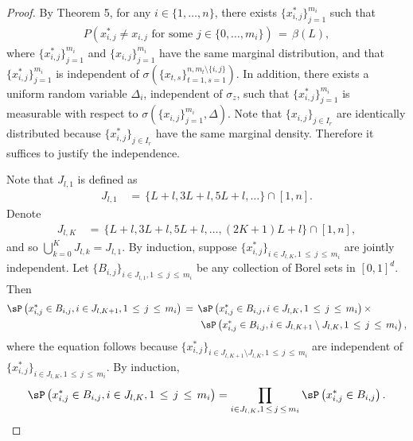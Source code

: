 \documentclass[twoside,11pt]{article}
\begin{document}
\begin{proof} By Theorem 5, for any $i \in \{1, \ldots, n\}$, there exists $\{x_{i,j}^*\}_{j=1}^{m_i}$ such that
\begin{align}
    P(x_{i,j}^* \neq x_{i,j} \text{ for some } j \in \{0, \ldots, m_i\}) \,=\, \beta(L), \label{eq:264}
\end{align}
where $\{x_{i,j}^*\}_{j=1}^{m_i}$ and $\{x_{i,j}\}_{j=1}^{m_i}$ have the same marginal distribution, and that $\{x_{i,j}^*\}_{j=1}^{m_i}$ is independent of $\sigma(\{x_{t,s}\}_{t=1,s=1}^{n,m_t \setminus \{i,j\}})$. In addition, there exists a uniform random variable $\Delta_i$, independent of $\sigma_z$, such that $\{x_{i,j}^*\}_{j=1}^{m_i}$ is measurable with respect to $\sigma(\{x_{i,j}\}_{j=1}^{m_i}, \Delta)$. Note that $\{x_{i,j}\}_{j\in I_{r}}$ are identically distributed because $\{x_{i,j}^*\}_{j\in I_{r}}$ have the same marginal density. Therefore it suffices to justify the independence.

Note that $J_{l,1}$ is defined as
\begin{align}
    J_{l,1} &\,=\, \{L + l, 3L + l, 5L + l, \ldots \} \cap [1,n].
\end{align}
Denote
\begin{align}
    J_{l,K} &\,=\, \{L + l, 3L + l, 5L + l, \ldots, (2K + 1)L + l\} \cap [1,n],
\end{align}
and so $\bigcup_{k=0}^{K}J_{l,k} = J_{l,1}$. By induction, suppose $\{x_{i,j}^*\}_{i\in J_{l,K}, 1\,\leq\, j \,\leq\, m_i}$ are jointly independent. Let $\{B_{i,j}\}_{i\in J_{l,1},1\,\leq\, j\,\leq\, m_i}$ be any collection of Borel sets in $[0,1]^d$. Then
\begin{align}
    \sP\left( x_{i,j}^* \in B_{i,j}, i \in J_{l,K+1}, 1 \,\leq\, j \,\leq\, m_i \right) 
    &\,=\, \sP\left( x_{i,j}^* \in B_{i,j}, i \in J_{l,K}, 1 \,\leq\, j \,\leq\, m_i \right) \times \nonumber \\
    & \qquad \sP\left( x_{i,j}^* \in B_{i,j}, i \in J_{l,K+1}\setminus J_{l,K}, 1 \,\leq\, j \,\leq\, m_i \right), \label{eq:induction_step}
\end{align}
where the equation follows because $\{x_{i,j}^*\}_{i\in J_{l,K+1}\setminus J_{l,K}, 1\,\leq\, j\,\leq\, m_i}$ are independent of $\{x_{i,j}^*\}_{i\in J_{l,K}, 1\,\leq\, j\,\leq\, m_i}$. By induction,
\begin{align}
    \sP\left( x_{i,j}^* \in B_{i,j}, i \in J_{l,K}, 1 \,\leq\, j \,\leq\, m_i \right) 
    = \prod_{i\in J_{l,K}, 1\,\leq\, j\,\leq\, m_i} \sP\left( x_{i,j}^* \in B_{i,j} \right).
\end{align}


\end{proof}
\end{document}
